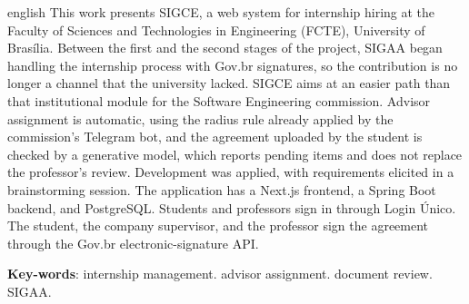 \begin{resumo}[Abstract]
 \begin{otherlanguage*}{english}
This work presents SIGCE, a web system for internship hiring at the Faculty of Sciences and Technologies in Engineering (FCTE), University of Brasília. Between the first and the second stages of the project, SIGAA began handling the internship process with Gov.br signatures, so the contribution is no longer a channel that the university lacked. SIGCE aims at an easier path than that institutional module for the Software Engineering commission. Advisor assignment is automatic, using the radius rule already applied by the commission's Telegram bot, and the agreement uploaded by the student is checked by a generative model, which reports pending items and does not replace the professor's review. Development was applied, with requirements elicited in a brainstorming session. The application has a Next.js frontend, a Spring Boot backend, and PostgreSQL. Students and professors sign in through Login Único. The student, the company supervisor, and the professor sign the agreement through the Gov.br electronic-signature API.

   \vspace{\onelineskip}
 
   \noindent 
   \textbf{Key-words}: internship management. advisor assignment. document review. SIGAA.
 \end{otherlanguage*}
\end{resumo}
